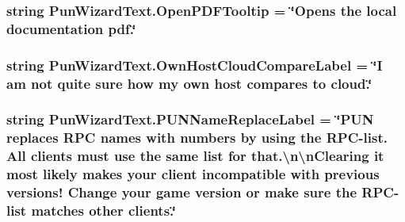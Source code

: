 \subsubsection[{\texorpdfstring{Open\+P\+D\+F\+Tooltip}{OpenPDFTooltip}}]{\setlength{\rightskip}{0pt plus 5cm}string Pun\+Wizard\+Text.\+Open\+P\+D\+F\+Tooltip = \char`\"{}Opens the local documentation pdf.\char`\"{}}\hypertarget{class_pun_wizard_text_a6bc9aad5c97f25fad71f4bf7fea36a44}{}\label{class_pun_wizard_text_a6bc9aad5c97f25fad71f4bf7fea36a44}
\subsubsection[{\texorpdfstring{Own\+Host\+Cloud\+Compare\+Label}{OwnHostCloudCompareLabel}}]{\setlength{\rightskip}{0pt plus 5cm}string Pun\+Wizard\+Text.\+Own\+Host\+Cloud\+Compare\+Label = \char`\"{}I am not quite sure how \textquotesingle{}my own host\textquotesingle{} compares to \textquotesingle{}cloud\textquotesingle{}.\char`\"{}}\hypertarget{class_pun_wizard_text_ab4bf251c3ea4d3fa69adc5a5e6d23561}{}\label{class_pun_wizard_text_ab4bf251c3ea4d3fa69adc5a5e6d23561}
\subsubsection[{\texorpdfstring{P\+U\+N\+Name\+Replace\+Label}{PUNNameReplaceLabel}}]{\setlength{\rightskip}{0pt plus 5cm}string Pun\+Wizard\+Text.\+P\+U\+N\+Name\+Replace\+Label = \char`\"{}P\+UN replaces R\+PC names with numbers by using the R\+PC-\/list. {\bf All} clients must use the same list for that.\textbackslash{}n\textbackslash{}n\+Clearing it most likely makes your client incompatible with previous versions! Change your game version or make sure the R\+PC-\/list matches other clients.\char`\"{}}\hypertarget{class_pun_wizard_text_a8b38849007b7e021a16bbe6daaadd0e8}{}\label{class_pun_wizard_text_a8b38849007b7e021a16bbe6daaadd0e8}
